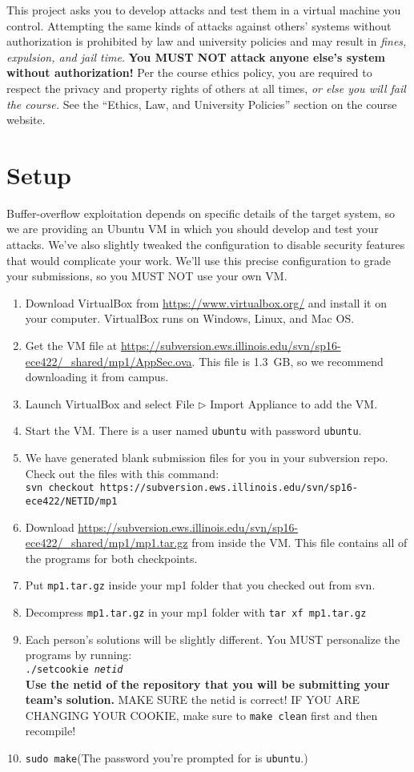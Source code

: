 \documentclass[letterpaper,12pt]{report}
\begin{document}
{This project asks you to develop attacks and test them in a virtual machine you control.  Attempting the same kinds of attacks against others' systems without authorization is prohibited by law and university policies and may result in \emph{fines, expulsion, and jail time}.   \textbf{You MUST NOT attack anyone else's system without authorization!}  Per the course ethics policy, you are required to respect the privacy and  property rights of others at all times, \emph{or else you will fail the course.}  See the ``Ethics, Law, and University Policies'' section on the course website.

\section*{Setup}

Buffer-overflow exploitation depends on specific details of the target system, so we are providing an Ubuntu VM in which you should develop and test your attacks.  We've also slightly tweaked the configuration to disable security features that would complicate your work.  We'll use this precise configuration to grade your submissions, so you MUST NOT use your own VM.

\begin{enumerate}
\item Download VirtualBox from \url{https://www.virtualbox.org/} and install it on your computer.  VirtualBox runs on Windows, Linux, and Mac OS.
\item Get the VM file at \url{https://subversion.ews.illinois.edu/svn/sp16-ece422/_shared/mp1/AppSec.ova}.  This file is 1.3~GB, so we recommend downloading it from campus.
\item Launch VirtualBox and select File $\rhd$ Import Appliance to add the VM.
\item Start the VM.  There is a user named \texttt{ubuntu} with password \texttt{ubuntu}.
\item We have generated blank submission files for you in your subversion repo.  Check out the files with this command:\\
\texttt{svn checkout https://subversion.ews.illinois.edu/svn/sp16-ece422/NETID/mp1}
\item Download \url{https://subversion.ews.illinois.edu/svn/sp16-ece422/_shared/mp1/mp1.tar.gz} from inside the VM.  This file contains all of the programs for both checkpoints.
\item Put \texttt{mp1.tar.gz} inside your mp1 folder that you checked out from svn.
\item Decompress \texttt{mp1.tar.gz} in your mp1 folder with \texttt{tar xf mp1.tar.gz}
\item Each person's solutions will be slightly different.  You MUST personalize the programs by running:\\
\texttt{./setcookie \emph{netid} }\\
{\bf Use the netid of the repository that you will be submitting your team's solution.}  MAKE SURE the netid is correct! IF YOU ARE CHANGING YOUR COOKIE, make sure to \texttt{make clean} first and then recompile!
\item \texttt{sudo make}\quad (The password you're prompted for is \texttt{ubuntu}.)



\end{enumerate}}
\end{document}
